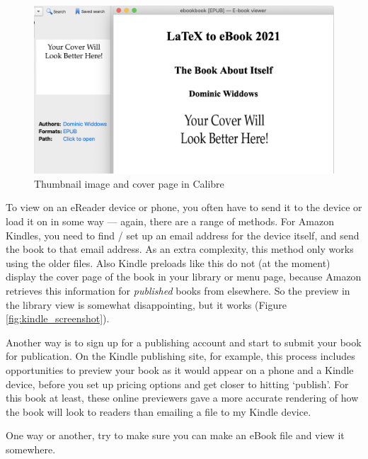 \begin{figure}
  \begin{center}
    \includegraphics[width=\linewidth]{images/calibre_screenshot.png}
    \htbr
    \caption{Thumbnail image and cover page in Calibre}
\label{fig:calibre_screenshot}
\end{center}
\end{figure}

To view on an eReader device or phone, you often have to send it to
the device or load it on in some way --- again, there are a range of
methods. For Amazon Kindles, you need to find / set up an email address for the
device itself, and send the book to that email address. As an extra
complexity, this method only works using the older 
files.  Also Kindle preloads like this do not (at the moment)
display the cover page of the book in your library or menu page,
because Amazon retrieves this information for {\em published} books
from elsewhere. So the preview in the library view is somewhat
disappointing, but it works (Figure \ref{fig:kindle_screenshot}).

Another way is to sign up for a publishing account and start to submit your book for
publication. On the Kindle publishing site, for example, this process includes opportunities
to preview your book as it would appear on a phone and a Kindle device, before you set up
pricing options and get closer to hitting `publish'. For this book at least, these online previewers
gave a more accurate rendering of how the book will look to readers than emailing a  file to my
Kindle device.

One way or another, try to make sure you can make an eBook file and view it somewhere.

